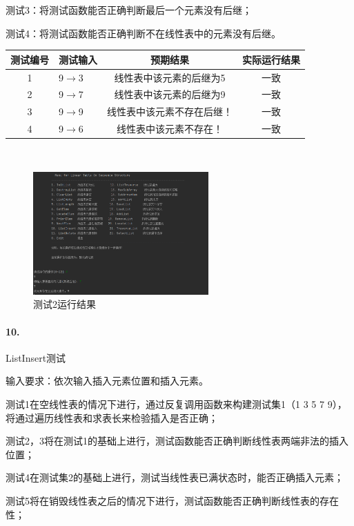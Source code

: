 \documentclass[supercite]{Experimental_Report}
\theoremstyle{definition}
\begin{document}
    测试3：将测试函数能否正确判断最后一个元素没有后继；

    测试4：将测试函数能否正确判断不在线性表中的元素没有后继。

\vspace{0.5em}

\begin{tabular}{|c|l|c|c|}
	\hline
	测试编号 & 测试输入 & 预期结果 & 实际运行结果 \\
	\hline
	1 & 9$\rightarrow$3 & 线性表中该元素的后继为5 & 一致 \\
	\hline
	2 & 9$\rightarrow$7 & 线性表中该元素的后继为9 & 一致 \\
	\hline
	3 & 9$\rightarrow$9 & 线性表中该元素不存在后继！ & 一致 \\
	\hline
	4 & 9$\rightarrow$6 & 线性表中该元素不存在！ & 一致 \\
	\hline
\end{tabular}

~\

 \begin{figure}[H]
 	\centering
 	\includegraphics[width=0.6\textwidth]{images/线性表测试9.png}
 	\caption{测试2运行结果}
 	\label{txlab}
 \end{figure}


\paragraph{10.}ListInsert测试

	输入要求：依次输入插入元素位置和插入元素。

	测试1在空线性表的情况下进行，通过反复调用函数来构建测试集1（1 3 5 7 9），将通过遍历线性表和求表长来检验插入是否正确；

	测试2，3将在测试1的基础上进行，测试函数能否正确判断线性表两端非法的插入位置；

	测试4在测试集2的基础上进行，测试当线性表已满状态时，能否正确插入元素；

	测试5将在销毁线性表之后的情况下进行，测试函数能否正确判断线性表的存在性；
\end{document}
